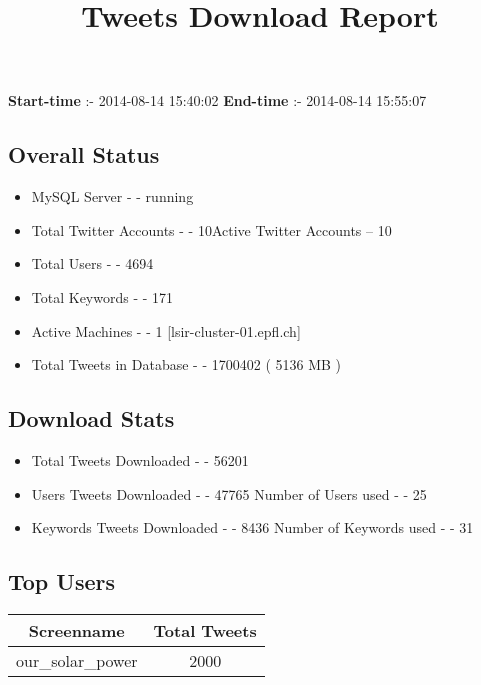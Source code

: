 \documentclass{article}\usepackage[T1]{fontenc}
\begin{document}
\title{\textbf{Tweets Download Report}}
               \date{}
                \maketitle
               \centerline{\textbf{Start-time} :- 2014-08-14 15:40:02 \hspace{40pt} \textbf{End-time} :- 2014-08-14 15:55:07}               \subsection*{Overall Status}                \begin{itemize}                \item MySQL Server - - running               \item Total Twitter Accounts - - 10\newline Active Twitter Accounts -- 10               \item Total Users - - 4694               \item Total Keywords - - 171               \item Active Machines - - 1 [lsir-cluster-01.epfl.ch]               \item Total Tweets in Database - - 1700402 ( 5136 MB )               \end{itemize}               \subsection*{Download Stats}                \begin{itemize}                \item Total Tweets Downloaded - - 56201               \item Users Tweets Downloaded - - 47765 \newline Number of Users used - - 25               \item Keywords Tweets Downloaded - - 8436 \newline Number of Keywords used - - 31              \end{itemize}              \subsection*{Top Users}\begin{tabular}{|c|c|}         \hline         Screenname & Total Tweets \\ 
 \hline
our\_solar\_power & 2000\\ 

\end{tabular}
\end{document}

